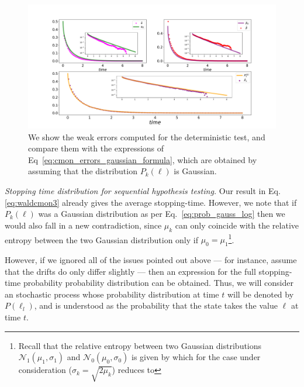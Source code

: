 \begin{figure}[t!]
    \centering
    \includegraphics[width=1.\textwidth]{Figures/CMON/damp-discri/temp/deterministic_errors_time_gamma429.pdf}
    \caption{We show the weak errors computed for the deterministic test, and compare them with the expressions of Eq~\ref{eq:cmon_errors_gaussian_formula}, which are obtained by assuming that the distribution $P_k(\ell)$ is Gaussian.}
    \label{fig:cmon_damping_err_weak}
\end{figure}

\emph{Stopping time distribution for sequential hypothesis testing.}
Our result in Eq.\eqref{eq:waldcmon3} already gives the average stopping-time. However, we note that if $P_k(\ell)$ was a Gaussian distribution as per Eq.~\ref{eq:prob_gauss_log} then we would also fall in a new contradiction, since $\mu_k$ can only coincide with the relative entropy between the two Gaussian distribution only if $\mu_0 = \mu_1$\footnote{Recall that the relative entropy between two Gaussian distributions $\mathcal{N}_1(\mu_1, \sigma_1)$ and $\mathcal{N}_0(\mu_0, \sigma_0)$ is given by
which for the case under consideration ($\sigma_k = \sqrt{2\mu_k}$) reduces to
}.

However, if we ignored all of the issues pointed out above --- for instance, assume that the drifts do only differ slightly --- then an expression for the full stopping-time probability probability distribution can be obtained. Thus, we will consider an stochastic process
whose probability distribution at time $t$ will be denoted by $P(\ell_{l})$, and is understood as the probability that the state takes the value $\ell$ at time $t$.

